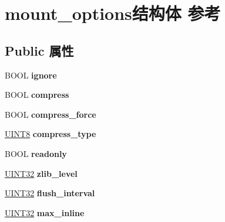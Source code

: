 \hypertarget{structmount__options}{}\section{mount\+\_\+options结构体 参考}
\label{structmount__options}
\subsection*{Public 属性}
\begin{DoxyCompactItemize}
\item 
\mbox{\label{structmount__options_a78a717bd3102c5c451b765240c2c02e7}} 
B\+O\+OL {\bfseries ignore}
\item 
\mbox{\label{structmount__options_a4e090a9411da8ed1d35bf83252830d23}} 
B\+O\+OL {\bfseries compress}
\item 
\mbox{\label{structmount__options_acc76a82508efde6b0cd799d9fdc98344}} 
B\+O\+OL {\bfseries compress\+\_\+force}
\item 
\mbox{\label{structmount__options_a0826f3c8cb24c6b2402087c45f6ed684}} 
\hyperlink{_processor_bind_8h_ab27e9918b538ce9d8ca692479b375b6a}{U\+I\+N\+T8} {\bfseries compress\+\_\+type}
\item 
\mbox{\label{structmount__options_a11948953c22b45450c2ef4c364215c68}} 
B\+O\+OL {\bfseries readonly}
\item 
\mbox{\label{structmount__options_a03daf4397751597b145910b84d994a40}} 
\hyperlink{_processor_bind_8h_ae1e6edbbc26d6fbc71a90190d0266018}{U\+I\+N\+T32} {\bfseries zlib\+\_\+level}
\item 
\mbox{\label{structmount__options_a27ac8452aea69366aa377870d1796810}} 
\hyperlink{_processor_bind_8h_ae1e6edbbc26d6fbc71a90190d0266018}{U\+I\+N\+T32} {\bfseries flush\+\_\+interval}
\item 
\mbox{\label{structmount__options_a6cdc2d46d6a88ed5fbdf7d0f9ecbb4c2}} 
\hyperlink{_processor_bind_8h_ae1e6edbbc26d6fbc71a90190d0266018}{U\+I\+N\+T32} {\bfseries max\+\_\+inline}

\end{DoxyCompactItemize}
